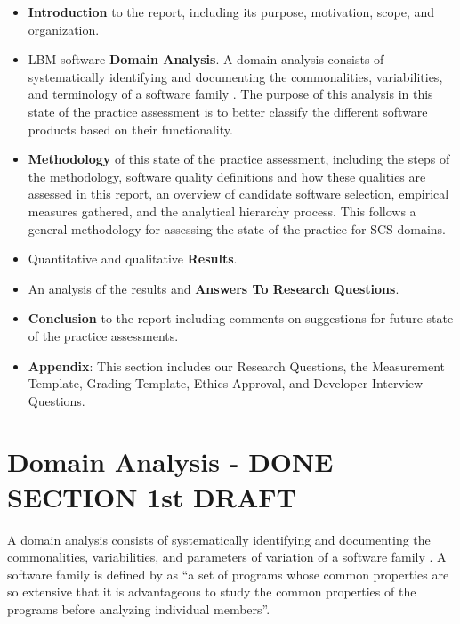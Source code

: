 \documentclass[12pt, notitlepage]{article}
\begin{document}
\begin{itemize}
	\item \textbf{Introduction} to the report, including its purpose, motivation, scope, and organization.
	\item LBM software \textbf{Domain Analysis}. A domain analysis consists of systematically identifying and documenting the commonalities, variabilities, and terminology of a software family \citep{Weiss1997}.
	The purpose of this analysis in this state of the practice assessment is to better classify the different software products based on their functionality.
	\item \textbf{Methodology} of this state of the practice assessment, including the steps of the methodology, software quality definitions and how these qualities are assessed in this report, an overview of candidate software selection, empirical measures gathered, and the analytical hierarchy process. This follows a general methodology for assessing the state of the practice for SCS domains.
	\item Quantitative and qualitative \textbf{Results}. 
	\item An analysis of the results and \textbf{Answers To Research Questions}.
	\item \textbf{Conclusion} to the report including comments on suggestions for future state of the practice assessments.
	\item \textbf{Appendix}: This section includes our Research Questions, the Measurement Template, Grading Template, Ethics Approval, and Developer Interview Questions.
\end{itemize}

\newpage

\section{Domain Analysis - DONE SECTION 1st DRAFT}\label{domainanalysis}

A domain analysis consists of systematically identifying and documenting the commonalities, variabilities, and parameters of variation of a software family \citep{Weiss1997}. A software family is defined by \cite{parnas1976design} as “a set of programs whose common properties are so extensive that it is advantageous to study the common properties of the programs before analyzing individual members”. 
\end{document}

